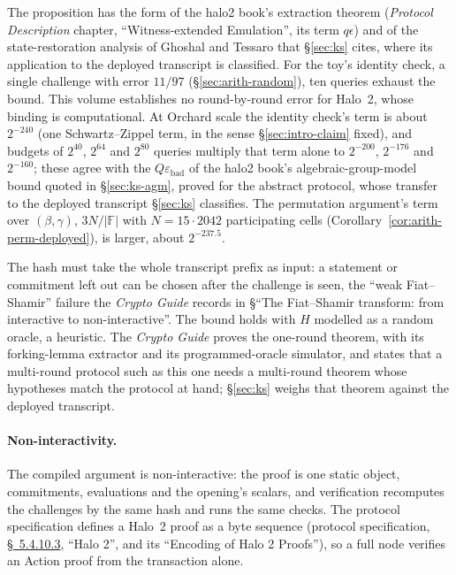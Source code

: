 \documentclass[11pt,a4paper]{article}
\theoremstyle{definition}
\newcommand{\F}{\mathbb{F}}
\begin{document}
The proposition has the form of the halo2 book's extraction theorem
(\emph{Protocol Description} chapter, ``Witness-extended Emulation'', its
term $q\epsilon$) and of the state-restoration analysis of Ghoshal and
Tessaro that \S\ref{sec:ks} cites, where its application to the
deployed transcript is classified.
For the toy's identity check, a single challenge with error $11/97$
(\S\ref{sec:arith-random}), ten queries exhaust the bound. This volume
establishes no round-by-round error for Halo~2, whose binding is computational.
At Orchard scale the identity check's term is about $2^{-240}$ (one
Schwartz--Zippel term, in the sense \S\ref{sec:intro-claim} fixed), and budgets
of $2^{40}$, $2^{64}$ and $2^{80}$ queries multiply that term alone to
$2^{-200}$, $2^{-176}$ and $2^{-160}$; these agree with the
$Q\varepsilon_{\mathrm{bad}}$ of the halo2 book's algebraic-group-model bound
quoted in \S\ref{sec:ks-agm}, proved for the abstract protocol, whose transfer
to the deployed transcript \S\ref{sec:ks} classifies. The permutation argument's
term over $(\beta, \gamma)$, $3N/|\F|$ with $N = 15 \cdot 2042$ participating
cells (Corollary~\ref{cor:arith-perm-deployed}), is larger, about $2^{-237.5}$.

The hash must take the whole transcript prefix as input: a statement or
commitment left out can be chosen after the challenge is seen, the
``weak Fiat--Shamir'' failure the \emph{Crypto Guide} records in
\S``The Fiat--Shamir transform: from interactive to non-interactive''.
The bound holds
with $H$ modelled as a random oracle, a heuristic. The \emph{Crypto
Guide} proves the one-round theorem, with its forking-lemma extractor
and its programmed-oracle simulator, and states that a multi-round
protocol such as this one needs a multi-round theorem whose hypotheses
match the protocol at hand; \S\ref{sec:ks} weighs that theorem against
the deployed transcript.

\paragraph{Non-interactivity.}
The compiled argument is non-interactive: the proof is one static
object, commitments, evaluations and the opening's scalars, and
verification recomputes the challenges by the same hash and runs the
same checks. The protocol specification defines a Halo~2 proof as a
byte sequence (protocol specification,
\href{https://zips.z.cash/protocol/protocol.pdf\#halo2}{\S~5.4.10.3},
``Halo 2'', and its ``Encoding of Halo 2 Proofs''), so a full node
verifies an Action proof from the transaction alone.
\end{document}
